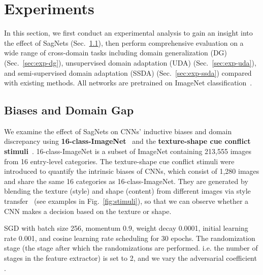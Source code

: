 \section{Experiments}
\label{sec:experiments}
In this section, we first conduct an experimental analysis to gain an insight into the effect of SagNets (Sec.~\ref{sec:exp-bias}), then perform comprehensive evaluation on a wide range of cross-domain tasks including domain generalization (DG) (Sec.~\ref{sec:exp-dg}), unsupervised domain adaptation (UDA) (Sec.~\ref{sec:exp-uda}), and semi-supervised domain adaptation (SSDA) (Sec.~\ref{sec:exp-ssda}) compared with existing methods.
All networks are pretrained on ImageNet classification~\cite{russakovsky2015imagenet}.


\subsection{Biases and Domain Gap}
\label{sec:exp-bias}
We examine the effect of SagNets on CNNs' inductive biases and domain discrepancy using \textbf{16-class-ImageNet}~\cite{geirhos2018generalisation} and the \textbf{texture-shape cue conflict stimuli}~\cite{geirhos2019imagenet}.
16-class-ImageNet is a subset of ImageNet containing 213,555 images from 16 entry-level categories.
The texture-shape cue conflict stimuli were introduced to quantify the intrinsic biases of CNNs, which consist of 1,280 images and share the same 16 categories as 16-class-ImageNet.
They are generated by blending the texture (style) and shape (content) from different images via style transfer~\cite{gatys2016image} (see examples in Fig.~\ref{fig:stimuli}), so that we can observe whether a CNN makes a decision based on the texture or shape. 

 SGD with batch size 256, momentum 0.9, weight decay 0.0001, initial learning rate 0.001, and cosine learning rate scheduling for 30 epochs.
The randomization stage (the stage after which the randomizations are performed. i.e. the number of stages in the feature extractor) is set to 2, and we vary the adversarial coefficient .


